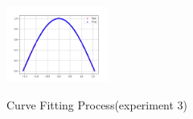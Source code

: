 \documentclass[12pt]{article}
\theoremstyle{remark}
\begin{document}
\begin{figure}[h]
{													\includegraphics[width=0.3\textwidth]{../width=100loss=mean_absolute_errorini=0.1rep=3/predict_plot_2500.png}}
												\caption{Curve Fitting Process(experiment 3)}
											\end{figure}
											\newpage
							
\end{document}
